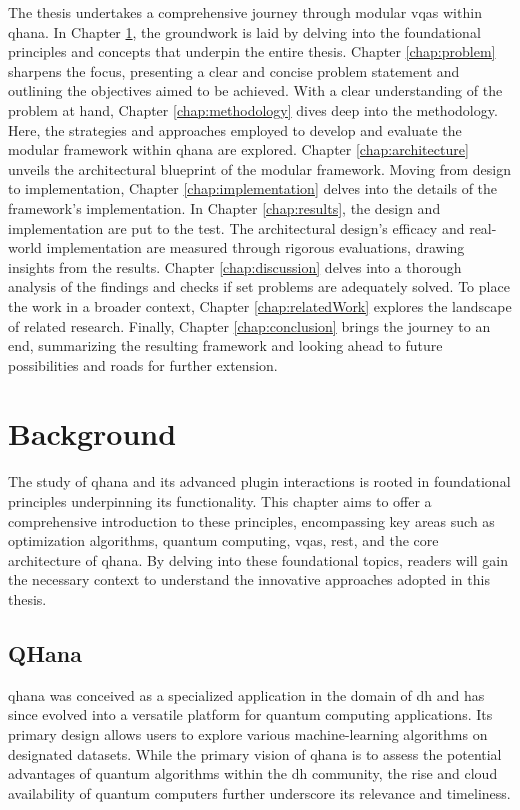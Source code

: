 \documentclass[
  a4paper,  %
  twoside,  %
  bibliography=totoc,
  headsepline,
  cleardoublepage=empty,
  parskip=half,
  draft=false
]{scrbook}
\begin{document}
The thesis undertakes a comprehensive journey through modular \glspl{vqa} within \gls{qhana}.
In Chapter \ref{chap:background}, the groundwork is laid by delving into the foundational principles and concepts that underpin the entire thesis.
Chapter \ref{chap:problem} sharpens the focus, presenting a clear and concise problem statement and outlining the objectives aimed to be achieved.
With a clear understanding of the problem at hand, Chapter \ref{chap:methodology} dives deep into the methodology.
Here, the strategies and approaches employed to develop and evaluate the modular framework within \gls{qhana} are explored.
Chapter \ref{chap:architecture} unveils the architectural blueprint of the modular framework.
Moving from design to implementation, Chapter \ref{chap:implementation} delves into the details of the framework's implementation.
In Chapter \ref{chap:results}, the design and implementation are put to the test. The architectural design's efficacy and real-world implementation are measured through rigorous evaluations, drawing insights from the results.
Chapter \ref{chap:discussion} delves into a thorough analysis of the findings and checks if set problems are adequately solved.
To place the work in a broader context, Chapter \ref{chap:relatedWork} explores the landscape of related research.
Finally, Chapter \ref{chap:conclusion} brings the journey to an end, summarizing the resulting framework and looking ahead to future possibilities and roads for further extension.


\chapter{Background}
\label{chap:background}

The study of \gls{qhana} and its advanced plugin interactions is rooted in foundational principles underpinning its functionality.
This chapter aims to offer a comprehensive introduction to these principles, encompassing key areas such as optimization algorithms, quantum computing, \glspl{vqa}, \gls{rest}, and the core architecture of \gls{qhana}.
By delving into these foundational topics, readers will gain the necessary context to understand the innovative approaches adopted in this thesis.

\section{QHana}
\label{sec:qhana}

\gls{qhana} was conceived as a specialized application in the domain of \gls{dh} and has since evolved into a versatile platform for quantum computing applications.
Its primary design allows users to explore various machine-learning algorithms on designated datasets.
While the primary vision of \gls{qhana} is to assess the potential advantages of quantum algorithms within the \gls{dh} community, the rise and cloud availability of quantum computers \cite{Castelvecchi2017} further underscore its relevance and timeliness.
\end{document}
